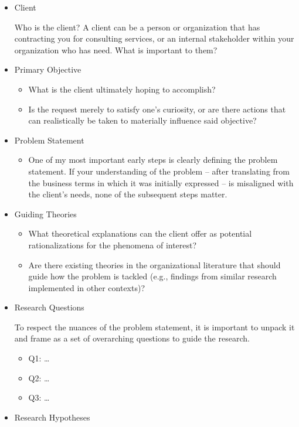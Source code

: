 \documentclass[]{book}
\providecommand{\tightlist}{%
  \setlength{\itemsep}{0pt}\setlength{\parskip}{0pt}}
\begin{document}
\begin{itemize}
\item
  Client

  Who is the client? A client can be a person or organization that has contracting you for consulting services, or an internal stakeholder within your organization who has need. What is important to them?
\item
  Primary Objective

  \begin{itemize}
  \tightlist
  \item
    What is the client ultimately hoping to accomplish?
  \item
    Is the request merely to satisfy one's curiosity, or are there actions that can realistically be taken to materially influence said objective?
  \end{itemize}
\item
  Problem Statement

  \begin{itemize}
  \tightlist
  \item
    One of my most important early steps is clearly defining the problem statement. If your understanding of the problem -- after translating from the business terms in which it was initially expressed -- is misaligned with the client's needs, none of the subsequent steps matter.
  \end{itemize}
\item
  Guiding Theories

  \begin{itemize}
  \tightlist
  \item
    What theoretical explanations can the client offer as potential rationalizations for the phenomena of interest?
  \item
    Are there existing theories in the organizational literature that should guide how the problem is tackled (e.g., findings from similar research implemented in other contexts)?
  \end{itemize}
\item
  Research Questions

  To respect the nuances of the problem statement, it is important to unpack it and frame as a set of overarching questions to guide the research.

  \begin{itemize}
  \tightlist
  \item
    Q1: \ldots{}
  \item
    Q2: \ldots{}
  \item
    Q3: \ldots{}
  \end{itemize}
\item
  Research Hypotheses


\end{itemize}
\end{document}
